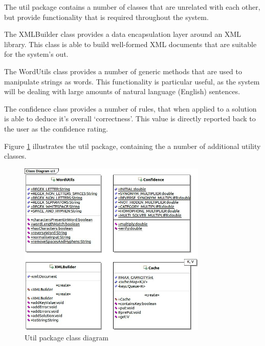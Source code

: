 The util package contains a number of classes that are unrelated with each 
other, but provide functionality that is required throughout the system.

The XMLBuilder class provides a data encapsulation layer around an XML library. 
This class is able to build well-formed XML documents that are suitable for the
system's out.

The WordUtils class provides a number of generic methods that are used to 
manipulate strings as words. This functionality is particular useful, as the 
system will be dealing with large amounts of natural language (English) 
sentences.

The confidence class provides a number of rules, that when applied to a solution
is able to deduce it's overall `correctness'. This value is directly reported 
back to the user as the confidence rating.

Figure \ref{fig:util_package} illustrates the util package, containing the
a number of additional utility classes.

\begin{figure}[H]
  \centering
  \includegraphics[width=0.8\textwidth]{design/class/util.jpg}
  \caption{Util package class diagram}
  \label{fig:util_package}
\end{figure}
